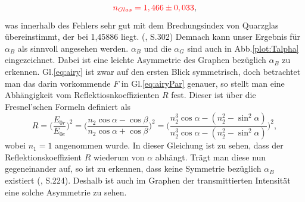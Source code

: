 \begin{equation*}
    \textcolor{red}{n_{Glas} = 1,466 \pm 0,033},
\end{equation*}
was innerhalb des Fehlers sehr gut mit dem Brechungsindex von Quarzglas übereinstimmt, der bei 1,45886 liegt. (\cite{Mende2016}, S.302) 
Demnach kann unser Ergebnis für $\alpha_B$ als sinnvoll angesehen werden.
$\alpha_B$ und die $\alpha_G$ sind auch in Abb.\ref{plot:Talpha} eingezeichnet. Dabei ist eine leichte Asymmetrie des Graphen bezüglich $\alpha_B$ zu erkennen. Gl.\ref{eq:airy} ist zwar auf den 
ersten Blick symmetrisch, doch betrachtet man das darin vorkommende $F$ in Gl.\ref{eq:airyPar} genauer, so stellt man eine Abhängigkeit vom Reflektiosnkoeffizienten $R$ fest. 
Dieser ist über die Fresnel'schen Formeln definiert als 
\begin{equation*}
    R =\biggl (\frac{E_{0r}}{E_{0e}} \biggl)^2 = \biggl(\frac{n_2\cos\alpha - \cos\beta}{n_2\cos\alpha + \cos\beta} \biggl)^2 = \biggl(\frac{n_2^3\cos\alpha - (n_2^2-\sin^2\alpha)}{n_2^3\cos\alpha - (n_2^2-\sin^2\alpha)} \biggl)^2,
\end{equation*}
wobei $n_1 = 1$ angenommen wurde. In dieser Gleichung ist zu sehen, dass der Reflektionskoeffizient $R$ wiederum von $\alpha$ abhängt. Trägt man diese nun gegeneinander auf, so ist zu erkennen, dass keine 
Symmetrie bezüglich $\alpha_B$ existiert (\cite{Demtroeder2017}, S.224). Deshalb ist auch im Graphen der transmittierten Intensität eine solche Asymmetrie zu sehen.


